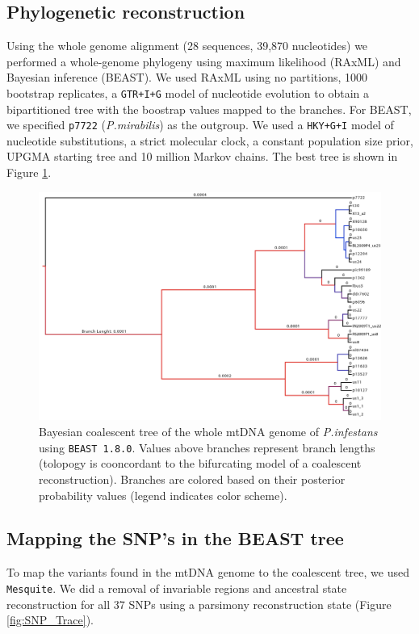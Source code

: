 \documentclass{article}\usepackage[]{graphicx}\usepackage[]{color}
\begin{document}
\subsection{Phylogenetic reconstruction}
Using the whole genome alignment (28 sequences, 39,870 nucleotides) we performed a whole-genome phylogeny using maximum likelihood (RAxML) and Bayesian inference (BEAST). We used RAxML using no partitions, 1000 bootstrap replicates, a \texttt{GTR+I+G} model of nucleotide evolution to obtain a bipartitioned tree with the boostrap values mapped to the branches. For BEAST, we specified \texttt{p7722} (\emph{P.mirabilis}) as the outgroup. We used a \texttt{HKY+G+I} model of nucleotide substitutions, a strict molecular clock, a constant population size prior, UPGMA starting tree and 10 million Markov chains. The best tree is shown in Figure \ref{fig:BEAST}.

\begin{figure}[p]
\centering
\includegraphics[scale=0.5]{mtdna_alin.jpg}
\caption[BEAST Coalescent tree]{Bayesian coalescent tree of the whole mtDNA genome of \emph{P.infestans} using \texttt{BEAST 1.8.0}. Values above branches represent branch lengths (tolopogy is cooncordant to the bifurcating model of a coalescent reconstruction). Branches are colored based on their posterior probability values (legend indicates color scheme).}
\label{fig:BEAST}
\end{figure}

\subsection{Mapping the SNP's in the BEAST tree}

To map the variants found in the mtDNA genome to the coalescent tree, we used \texttt{Mesquite}. We did a removal of invariable regions and ancestral state reconstruction for all 37 SNPs using a parsimony reconstruction state (Figure \ref{fig:SNP_Trace}).
\end{document}
